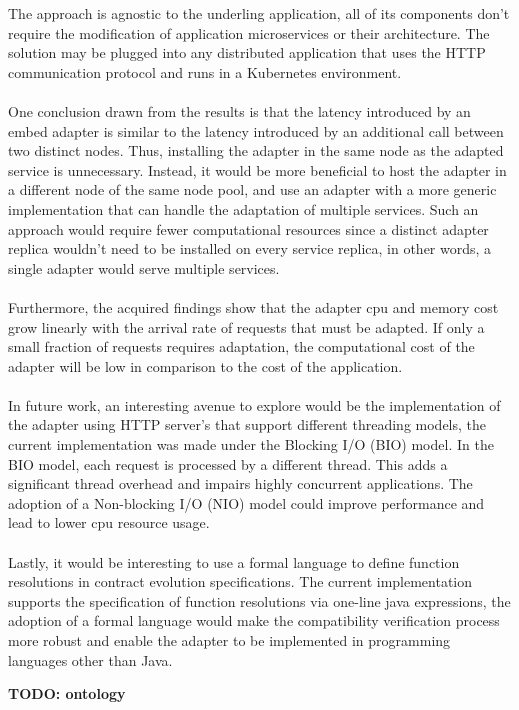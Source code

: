 The approach is agnostic to the underling application, all of its components don't require the modification of application microservices or their architecture.
The solution may be plugged into any distributed application that uses the HTTP communication protocol and runs in a Kubernetes environment.

\paragraph{}

One conclusion drawn from the results is that the latency introduced by an embed adapter is similar to the latency introduced by an additional call between two distinct nodes.
Thus, installing the adapter in the same node as the adapted service is unnecessary.
Instead, it would be more beneficial to host the adapter in a different node of the same node pool, and use an adapter with a more generic implementation that can handle the adaptation of multiple services.
Such an approach would require fewer computational resources since a distinct adapter replica wouldn't need to be installed on every service replica, in other words, a single adapter would serve multiple services.

\paragraph{}

Furthermore, the acquired findings show that the adapter cpu and memory cost grow linearly with the arrival rate of requests that must be adapted.
If only a small fraction of requests requires adaptation, the computational cost of the adapter will be low in comparison to the cost of the application.

\paragraph{}

In future work, an interesting avenue to explore would be the implementation of the adapter using HTTP server's that support different threading models, the current implementation
was made under the Blocking I/O (BIO) model.
In the BIO model, each request is processed by a different thread.
This adds a significant thread overhead and impairs highly concurrent applications.
The adoption of a Non-blocking I/O (NIO) model could improve performance and lead to lower cpu resource usage.

\paragraph{}

Lastly, it would be interesting to use a formal language to define function resolutions in contract evolution specifications.
The current implementation supports the specification of function resolutions via one-line java expressions,
the adoption of a formal language would make the compatibility verification process more robust and enable the adapter to be implemented in programming languages other than Java.

\textbf{TODO: ontology}


